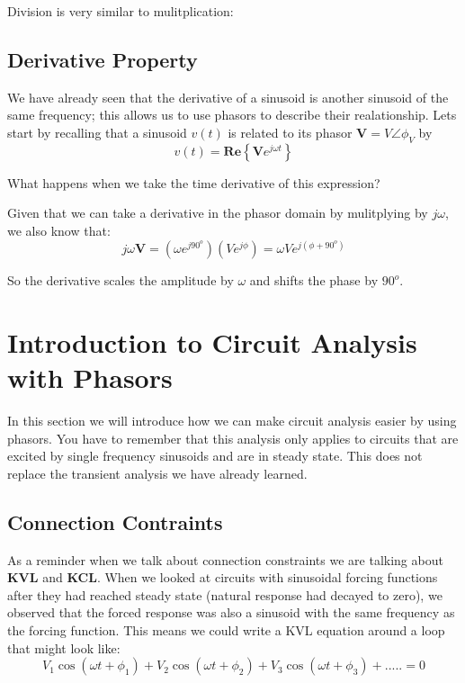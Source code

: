 \documentclass{handout}
\begin{document}
Division is very similar to mulitplication:
\soln{1in}{
\[
\frac{A\angle\phi_A}{B\angle\phi_B} = \frac{A}{B}\angle(\phi_A-\phi_B)
\]
}


\subsection{Derivative Property}
We have already seen that the derivative of a sinusoid is another sinusoid of the same frequency; this allows us to use phasors to describe their realationship.  Lets start by recalling that a sinusoid $v(t)$ is related to its phasor $\mathbf{V} = V\angle \phi_V$ by
\[
v(t) = \mathbf{Re}\left\{ \mathbf{V}e^{j\omega t} \right\}
\]

What happens when we take the time derivative of this expression?

Given that we can take a derivative in the phasor domain by mulitplying by $j\omega$, we also know that:
\[
j\omega\mathbf{V} = \left(\omega e^{j90^o}\right)\left( V e^{j \phi} \right) = \omega  V e^{j (\phi + 90^o) }
\]

So the derivative scales the amplitude by $\omega$ and shifts the phase by $90^o$.


\newpage
\clearpage
\pagebreak

\section{Introduction to Circuit Analysis with Phasors}
In this section we will introduce how we can make circuit analysis easier by using phasors.  You have to remember that this analysis only applies to circuits that are excited by single frequency sinusoids and are in steady state.  This does not replace the transient analysis we have already learned.

\subsection{Connection Contraints}
As a reminder when we talk about connection constraints we are talking about \textbf{KVL} and \textbf{KCL}.  When we looked at circuits with sinusoidal forcing functions after they had reached steady state (natural response had decayed to zero), we observed that the forced response was also a sinusoid with the same frequency as the forcing function.  This means we could write a KVL equation around a loop that might look like:
\[
V_1\cos(\omega t +\phi_1) +V_2\cos(\omega t +\phi_2) + V_3\cos(\omega t +\phi_3) +..... = 0
\]
\end{document}
